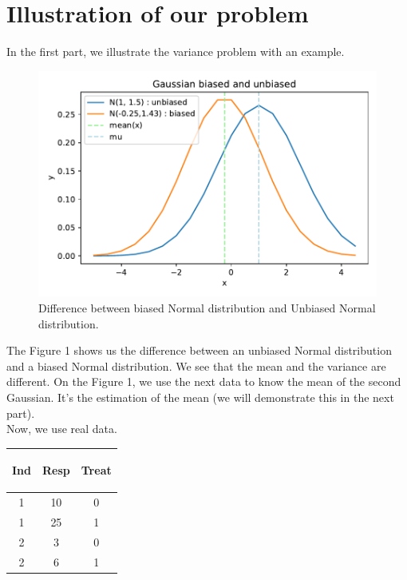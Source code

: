 \documentclass{article}
\begin{document}
\section{Illustration of our problem}
In the first part, we illustrate the variance problem with an example. 
\begin{figure}[H]
    \begin{center}
    \includegraphics[scale=0.7]{./images/Biased_normal_distri.pdf}
    \caption{Difference between biased Normal distribution and Unbiased Normal distribution.}
    \end{center}
\end{figure}
The Figure 1 shows us the difference between an unbiased Normal distribution and a biased Normal distribution. We see that the mean and the variance are different. On the Figure 1, we use the next data to know the mean of the second Gaussian. It's the estimation of the mean (we will demonstrate this in the next part).\\
Now, we use real data.\\
\begin{table}[h!]
        \centering
        \begin{tabular}{| c | c | c|}
        \hline
        \begin{bf} Ind \end{bf} &
        \begin{bf} Resp \end{bf} &
        \begin{bf} Treat \end{bf} \\
        \hline
        1 &  10 & 0\\
        1 & 25 & 1 \\
        2 & 3 & 0 \\
        2 &  6 & 1\\
        \hline
        \end{tabular}
\end{table}
\end{document}
